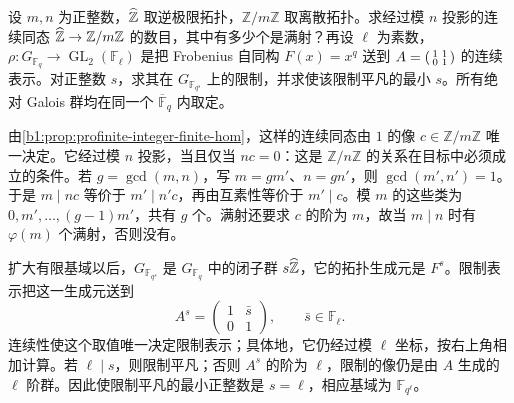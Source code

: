\begin{exercise}\label{b1:ex:22-14}
	设 \(m,n\) 为正整数，\(\widehat{\vphantom{Z}\mathbb Z}\) 取逆极限拓扑，\(\mathbb Z/m\mathbb Z\) 取离散拓扑。求经过模 \(n\) 投影的连续同态 \(\widehat{\vphantom{Z}\mathbb Z}\to\mathbb Z/m\mathbb Z\) 的数目，其中有多少个是满射？再设 \(\ell\) 为素数，\(\rho:G_{\mathbb F_q}\to\operatorname{GL}_2(\mathbb F_\ell)\) 是把 Frobenius 自同构 \(F(x)=x^q\) 送到 \(A=\begin{psmallmatrix}1&1\\0&1\end{psmallmatrix}\) 的连续表示。对正整数 \(s\)，求其在 \(G_{\mathbb F_{q^s}}\) 上的限制，并求使该限制平凡的最小 \(s\)。所有绝对 Galois 群均在同一个 \(\overline{\mathbb F}_q\) 内取定。
\end{exercise}
\begin{solution}
	由\cref{b1:prop:profinite-integer-finite-hom}，这样的连续同态由 \(1\) 的像 \(c\in\mathbb Z/m\mathbb Z\) 唯一决定。它经过模 \(n\) 投影，当且仅当 \(nc=0\)：这是 \(\mathbb Z/n\mathbb Z\) 的关系在目标中必须成立的条件。若 \(g=\gcd(m,n)\)，写 \(m=gm'\)、\(n=gn'\)，则 \(\gcd(m',n')=1\)。于是 \(m\mid nc\) 等价于 \(m'\mid n'c\)，再由互素性等价于 \(m'\mid c\)。模 \(m\) 的这些类为 \(0,m',\ldots,(g-1)m'\)，共有 \(g\) 个。满射还要求 \(c\) 的阶为 \(m\)，故当 \(m\mid n\) 时有 \(\varphi(m)\) 个满射，否则没有。

	扩大有限基域以后，\(G_{\mathbb F_{q^s}}\) 是 \(G_{\mathbb F_q}\) 中的闭子群 \(s\widehat{\vphantom{Z}\mathbb Z}\)，它的拓扑生成元是 \(F^s\)。限制表示把这一生成元送到
	\[
		A^s=\begin{pmatrix}1&\bar s\\0&1\end{pmatrix},\qquad \bar s\in\mathbb F_\ell.
	\]
	连续性使这个取值唯一决定限制表示；具体地，它仍经过模 \(\ell\) 坐标，按右上角相加计算。若 \(\ell\mid s\)，则限制平凡；否则 \(A^s\) 的阶为 \(\ell\)，限制的像仍是由 \(A\) 生成的 \(\ell\) 阶群。因此使限制平凡的最小正整数是 \(s=\ell\)，相应基域为 \(\mathbb F_{q^\ell}\)。
\end{solution}

